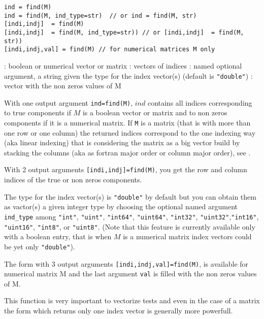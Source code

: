 
\begin{mandesc}
\end{mandesc}

\begin{calling_sequence}
\begin{verbatim}
ind = find(M)
ind = find(M, ind_type=str)  // or ind = find(M, str)
[indi,indj]  = find(M)
[indi,indj]  = find(M, ind_type=str)) // or [indi,indj]  = find(M, str))
[indi,indj,val] = find(M) // for numerical matrices M only
\end{verbatim}
\end{calling_sequence}
\begin{parameters}
  \begin{varlist}
    :  boolean or  numerical vector or matrix
    : vectors of indices
    : named optional argument, a string given the type for the index vector(s) (default is \verb+"double"+)
    : vector with the non zeros values of M
  \end{varlist}
\end{parameters}

\begin{mandescription}
With one output argument \verb+ind=find(M)+,  $ind$ contains all indices 
corresponding to true components if $M$ is a boolean vector or matrix 
and to non zeros components if it is a numerical matrix. If \verb+M+
is a matrix (that is with more than one row or one
column) the returned indices correspond to the one indexing way (aka
linear indexing)
that is considering the matrix as a big vector build by stacking 
the columns (aka as fortran major order or column major order),
see .

With 2 output arguments \verb+[indi,indj]=find(M)+,
you get the  row and column indices of the true or non zeros components.

The type for the index vector(s) is \verb+"double"+ by default but you
can obtain them as vactor(s) a given integer type by choosing the optional named argument
\verb+ind_type+ among \verb+"int"+,  \verb+"uint"+, \verb+"int64"+, \verb+"uint64"+,
\verb+"int32"+, \verb+"uint32"+,\verb+"int16"+, \verb+"uint16"+, \verb+"int8"+, or \verb+"uint8"+.
(Note that this feature is currently available only with a boolean entry, that is
when  $M$ is a numerical matrix index vectors could be yet only \verb+"double"+).

The form with 3 output arguments \verb+[indi,indj,val]=find(M)+, is available
for numerical matrix M and the last argument \verb+val+ is filled with
the non zeros values of M.


This function is very important to vectorize tests and even in the 
case of a matrix the form which returns only one 
index vector is generally more powerfull.
\end{mandescription}

